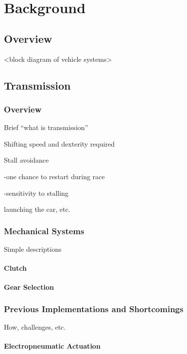 \chapter{Background}

\section{Overview}

<block diagram of vehicle systems>

\section{Transmission}


\subsection{Overview}

Brief {}``what is transmission''

Shifting speed and dexterity required

Stall avoidance

-one chance to restart during race

-sensitivity to stalling

launching the car, etc.


\subsection{Mechanical Systems}

Simple descriptions


\subsubsection{Clutch}


\subsubsection{Gear Selection}


\subsection{Previous Implementations and Shortcomings}

How, challenges, etc.


\subsubsection{Electropneumatic Actuation}


